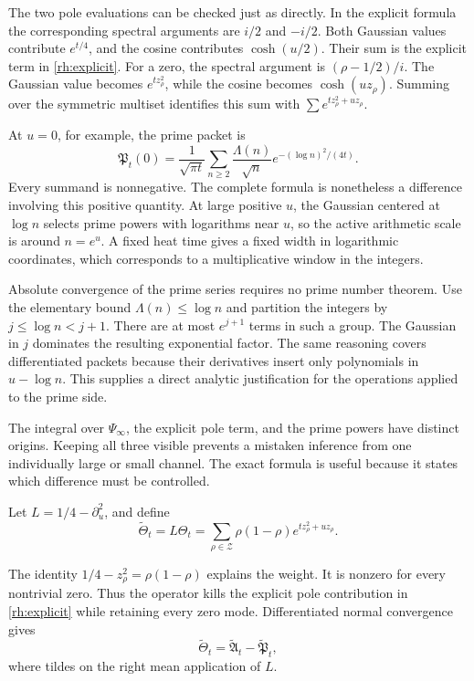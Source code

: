 The two pole evaluations can be checked just as directly. In the explicit formula the corresponding spectral arguments are \(i/2\) and \(-i/2\). Both Gaussian values contribute \(e^{t/4}\), and the cosine contributes \(\cosh(u/2)\). Their sum is the explicit term in \eqref{rh:explicit}. For a zero, the spectral argument is \((\rho-1/2)/i\). The Gaussian value becomes \(e^{tz_\rho^2}\), while the cosine becomes \(\cosh(uz_\rho)\). Summing over the symmetric multiset identifies this sum with \(\sum e^{tz_\rho^2+uz_\rho}\).

At \(u=0\), for example, the prime packet is
\[
\mathfrak P_t(0)=\frac1{\sqrt{\pi t}}
\sum_{n\ge2}\frac{\Lambda(n)}{\sqrt n}
e^{-(\log n)^2/(4t)}.
\]
Every summand is nonnegative. The complete formula is nonetheless a difference involving this positive quantity. At large positive \(u\), the Gaussian centered at \(\log n\) selects prime powers with logarithms near \(u\), so the active arithmetic scale is around \(n=e^u\). A fixed heat time gives a fixed width in logarithmic coordinates, which corresponds to a multiplicative window in the integers.

Absolute convergence of the prime series requires no prime number theorem. Use the elementary bound \(\Lambda(n)\le\log n\) and partition the integers by \(j\le\log n<j+1\). There are at most \(e^{j+1}\) terms in such a group. The Gaussian in \(j\) dominates the resulting exponential factor. The same reasoning covers differentiated packets because their derivatives insert only polynomials in \(u-\log n\). This supplies a direct analytic justification for the operations applied to the prime side.

The integral over \(\Psi_\infty\), the explicit pole term, and the prime powers have distinct origins. Keeping all three visible prevents a mistaken inference from one individually large or small channel. The exact formula is useful because it states which difference must be controlled.

\begin{definition}\label{rh:polefree}
Let \(L=1/4-\partial_u^2\), and define
\begin{equation}\label{rh:tilde}
\widetilde\Theta_t=L\Theta_t
=\sum_{\rho\in\mathcal Z}\rho(1-\rho)
e^{tz_\rho^2+uz_\rho}.
\end{equation}
\end{definition}

The identity \(1/4-z_\rho^2=\rho(1-\rho)\) explains the weight. It is nonzero for every nontrivial zero. Thus the operator kills the explicit pole contribution in \eqref{rh:explicit} while retaining every zero mode. Differentiated normal convergence gives
\begin{equation}\label{rh:tildeexplicit}
\widetilde\Theta_t=\widetilde{\mathfrak A}_t-
\widetilde{\mathfrak P}_t,
\end{equation}
where tildes on the right mean application of \(L\).

